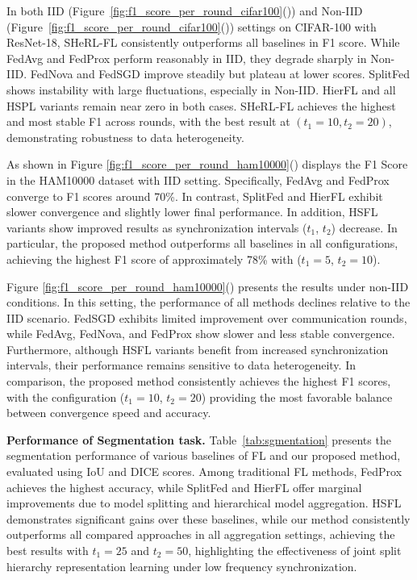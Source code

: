 \documentclass[letterpaper]{article} %
\begin{document}
        In both IID (Figure~\ref{fig:f1_score_per_round_cifar100}()) and Non-IID (Figure~\ref{fig:f1_score_per_round_cifar100}()) settings on CIFAR-100 with ResNet-18, SHeRL-FL consistently outperforms all baselines in F1 score. While FedAvg and FedProx perform reasonably in IID, they degrade sharply in Non-IID. FedNova and FedSGD improve steadily but plateau at lower scores. SplitFed shows instability with large fluctuations, especially in Non-IID. HierFL and all HSPL variants remain near zero in both cases. SHeRL-FL achieves the highest and most stable F1 across rounds, with the best result at $(t_1=10, t_2=20)$, demonstrating robustness to data heterogeneity.
        
        As shown in Figure \ref{fig:f1_score_per_round_ham10000}() displays the F1 Score in the HAM10000 dataset with IID setting. Specifically, FedAvg and FedProx converge to F1 scores around 70\%. In contrast, SplitFed and HierFL exhibit slower convergence and slightly lower final performance. In addition, HSFL variants show improved results as synchronization intervals ($t_1$, $t_2$) decrease. In particular, the proposed method outperforms all baselines in all configurations, achieving the highest F1 score of approximately 78\% with ($t_1=5$, $ t_2=10$).

        Figure \ref{fig:f1_score_per_round_ham10000}() presents the results under non-IID conditions. In this setting, the performance of all methods declines relative to the IID scenario. FedSGD exhibits limited improvement over communication rounds, while FedAvg, FedNova, and FedProx show slower and less stable convergence. Furthermore, although HSFL variants benefit from increased synchronization intervals, their performance remains sensitive to data heterogeneity. In comparison, the proposed method consistently achieves the highest F1 scores, with the configuration ($t_1=10$, $t_2=20$) providing the most favorable balance between convergence speed and accuracy.
        
        
     \textbf{Performance of Segmentation task.} Table~\ref{tab:sgmentation} presents the segmentation performance of various baselines of FL and our proposed method, evaluated using IoU and DICE scores. Among traditional FL methods, FedProx achieves the highest accuracy, while SplitFed and HierFL offer marginal improvements due to model splitting and hierarchical model aggregation. HSFL demonstrates significant gains over these baselines, while our method consistently outperforms all compared approaches in all aggregation settings, achieving the best results with $t_1{=}25$ and $t_2{=}50$, highlighting the effectiveness of joint split hierarchy representation learning under low frequency synchronization.
        
\end{document}
